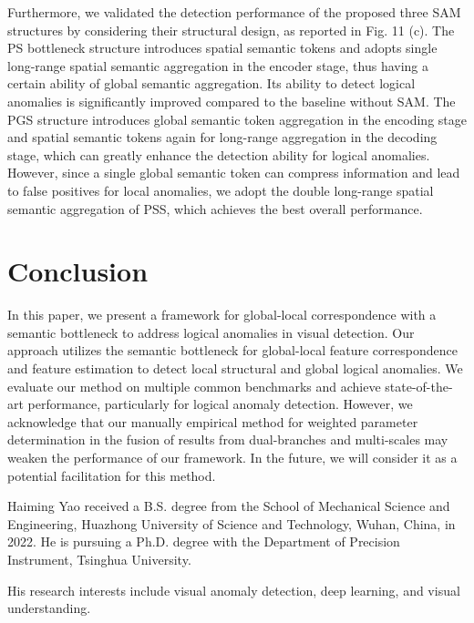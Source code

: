 \documentclass[lettersize,journal]{IEEEtran}
\begin{document}
Furthermore, we validated the detection performance of the proposed three SAM structures by considering their structural design, as reported in Fig. 11 (c). The PS bottleneck structure introduces spatial semantic tokens and adopts single long-range spatial semantic aggregation in the encoder stage, thus having a certain ability of global semantic aggregation. Its ability to detect logical anomalies is significantly improved compared to the baseline without SAM. The PGS structure introduces global semantic token aggregation in the encoding stage and spatial semantic tokens again for long-range aggregation in the decoding stage, which can greatly enhance the detection ability for logical anomalies. However, since a single global semantic token can compress information and lead to false positives for local anomalies, we adopt the double long-range spatial semantic aggregation of PSS, which achieves the best overall performance.

\section{Conclusion}
In this paper, we present a framework for global-local correspondence with a semantic bottleneck to address logical anomalies in visual detection. Our approach utilizes the semantic bottleneck for global-local feature correspondence and feature estimation to detect local structural and global logical anomalies. We evaluate our method on multiple common benchmarks and achieve state-of-the-art performance, particularly for logical anomaly detection. However, we acknowledge that our manually empirical method for weighted parameter determination in the fusion of results from dual-branches and multi-scales may weaken the performance of our framework. In the future, we will consider it as a potential facilitation for this method.

 


\begin{IEEEbiography}{Haiming Yao} received a B.S. degree from the School of Mechanical Science and Engineering, Huazhong University of Science and Technology, Wuhan, China, in 2022.
He is pursuing a Ph.D. degree with
the Department of Precision Instrument, Tsinghua
University.

His research interests include visual anomaly detection, deep learning, and visual understanding.
\end{IEEEbiography}
\end{document}
